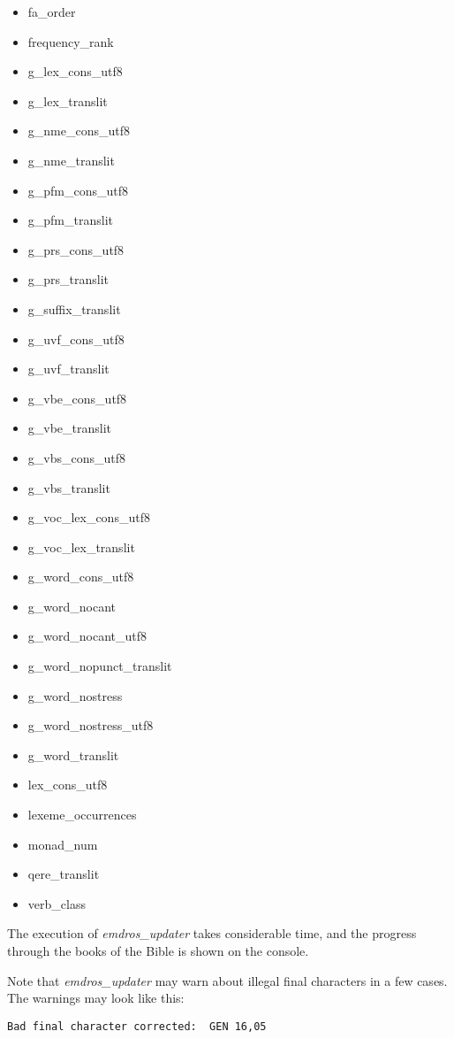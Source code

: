 \documentclass[11pt,oneside,a4paper,article]{memoir}
\newcommand{\heb}[1]{{\RL {\ezr #1}}}
\begin{document}
\begin{itemize}
\item fa\_order
\item frequency\_rank
\item g\_lex\_cons\_utf8
\item g\_lex\_translit
\item g\_nme\_cons\_utf8
\item g\_nme\_translit
\item g\_pfm\_cons\_utf8
\item g\_pfm\_translit
\item g\_prs\_cons\_utf8
\item g\_prs\_translit
\item g\_suffix\_translit
\item g\_uvf\_cons\_utf8
\item g\_uvf\_translit
\item g\_vbe\_cons\_utf8
\item g\_vbe\_translit
\item g\_vbs\_cons\_utf8
\item g\_vbs\_translit
\item g\_voc\_lex\_cons\_utf8
\item g\_voc\_lex\_translit
\item g\_word\_cons\_utf8
\item g\_word\_nocant
\item g\_word\_nocant\_utf8
\item g\_word\_nopunct\_translit
\item g\_word\_nostress
\item g\_word\_nostress\_utf8
\item g\_word\_translit
\item lex\_cons\_utf8
\item lexeme\_occurrences
\item monad\_num
\item qere\_translit
\item verb\_class
\end{itemize}

The execution of \emph{emdros\_updater} takes considerable time, and the progress through the books
of the Bible is shown on the console.

Note that \emph{emdros\_updater} may warn about illegal final characters in a few cases. The warnings
may look like this:

\vspace{1ex}

  \quad\texttt{Bad final character corrected: }\heb{בֵינֶֽיכָ}\texttt{  GEN 16,05}
\end{document}

